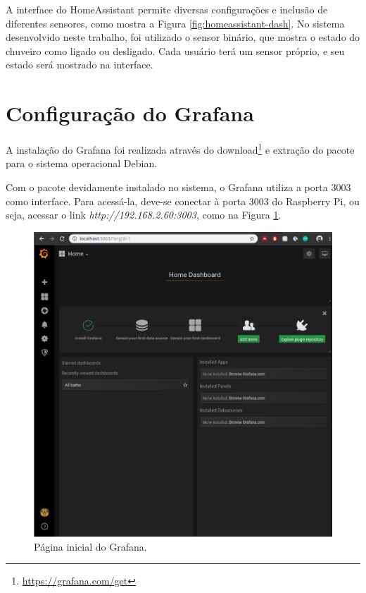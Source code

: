 A interface do HomeAssistant permite diversas configurações e inclusão de diferentes sensores, como mostra a Figura \ref{fig:homeassistant-dash}. No sistema desenvolvido neste trabalho, foi utilizado o sensor binário, que mostra o estado do chuveiro como ligado ou desligado. Cada usuário terá um sensor próprio, e seu estado será mostrado na interface.


\section{Configuração do Grafana}

A instalação do Grafana foi realizada através do download\footnote{\url{https://grafana.com/get}} e extração do pacote para o sistema operacional Debian.

Com o pacote devidamente instalado no sistema, o Grafana utiliza a porta 3003 como interface. Para acessá-la, deve-se conectar à porta 3003 do Raspberry Pi, ou seja, acessar o link \textit{http://192.168.2.60:3003}, como na Figura \ref{fig:grafanahome}.

\begin{figure}[htbp]
	\centering
	\includegraphics[width=1\linewidth]{figuras/grafanahome.png}
	\caption{Página inicial do Grafana.}
	\label{fig:grafanahome}
\end{figure}

